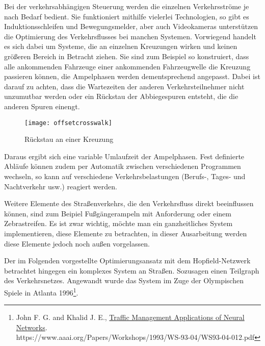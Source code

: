 Bei der verkehrsabhängigen Steuerung werden die einzelnen Verkehrsströme je nach Bedarf bedient. Sie funktioniert mithilfe vielerlei Technologien, so gibt es Induktionsschleifen und Bewegungsmelder, aber auch Videokameras unterstützen die Optimierung des Verkehrsflusses bei manchen Systemen. Vorwiegend handelt es sich dabei um Systeme, die an einzelnen Kreuzungen wirken und keinen größeren Bereich in Betracht ziehen. Sie sind zum Beispiel so konstruiert, dass alle ankommenden Fahrzeuge einer ankommenden Fahrzeugwelle die Kreuzung passieren können, die Ampelphasen werden dementsprechend angepasst. Dabei ist darauf zu achten, dass die Wartezeiten der anderen Verkehrsteilnehmer nicht unzumutbar werden oder ein Rückstau der Abbiegespuren entsteht, die die anderen Spuren einengt.

\begin{figure}[H]
    \centering
    \texttt{[image: offsetcrosswalk]}
    \caption{Rückstau an einer Kreuzung}
    \label{intro:rueckstau}
\end{figure}

Daraus ergibt sich eine variable Umlaufzeit der Ampelphasen. Fest definierte Abläufe können zudem per Automatik zwischen verschiedenen Programmen wechseln, so kann auf verschiedene Verkehrsbelastungen (Berufs-, Tages- und Nachtverkehr usw.) reagiert werden.

Weitere Elemente des Straßenverkehrs, die den Verkehrsfluss direkt beeinflussen können, sind zum Beipiel Fußgängerampeln mit Anforderung oder einem Zebrastreifen. Es ist zwar wichtig, möchte man ein ganzheitliches System implementieren, diese Elemente zu betrachten, in dieser Ausarbeitung werden diese Elemente jedoch noch außen vorgelassen.

Der im Folgenden vorgestellte Optimierungsansatz mit dem Hopfield-Netzwerk betrachtet hingegen ein komplexes System an Straßen. Sozusagen einen Teilgraph des Verkehrsnetzes. Angewandt wurde das System im Zuge der Olympischen Spiele in Atlanta 1996\footnote{John F. G. and Khalid J. E., \href{https://www.aaai.org/Papers/Workshops/1993/WS-93-04/WS93-04-012.pdf}{Traffic Management Applications of Neural Networks}. \\https://www.aaai.org/Papers/Workshops/1993/WS-93-04/WS93-04-012.pdf}.


